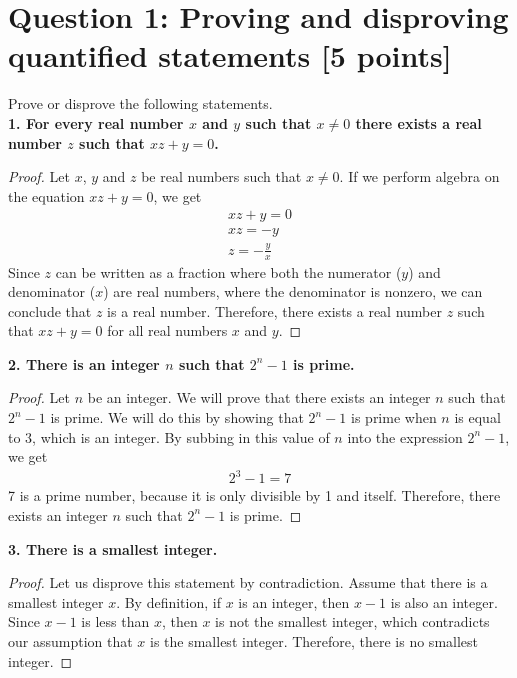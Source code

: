 \documentclass{report}
\theoremstyle{mytheoremstyle}
\theoremstyle{mytheoremstyle}
\theoremstyle{myproblemstyle}
\begin{document}
\section*{\Large{Question 1: Proving and disproving quantified statements [5 points]}}
Prove or disprove the following statements.
\\[\baselineskip]
\textbf{1. For every real number $x$ and $y$ such that $x \neq 0$ there exists a real number $z$ such that $xz+y=0$.}
\begin{proof}
Let $x$, $y$ and $z$ be real numbers such that $x \neq 0$. If we perform algebra on the equation $xz+y=0$, we get 
\begin{align}
xz+y = 0 \\
xz = -y \\
z = -\frac{y}{x}
\end{align}
Since $z$ can be written as a fraction where both the numerator ($y$) and denominator ($x$) are real numbers, where the denominator is nonzero, we can conclude that $z$ is a real number. Therefore, there exists a real number $z$ such that $xz+y=0$ for all real numbers $x$ and $y$.
\end{proof}
\textbf{2. There is an integer $n$ such that $2^n-1$ is prime.}
\begin{proof}
Let $n$ be an integer. We will prove that there exists an integer $n$ such that $2^n-1$ is prime. We will do this by showing that $2^n-1$ is prime when $n$ is equal to $3$, which is an integer. By subbing in this value of $n$ into the expression $2^n-1$, we get 
\begin{align}
2^3-1=7
\end{align}
7 is a prime number, because it is only divisible by 1 and itself. Therefore, there exists an integer $n$ such that $2^n-1$ is prime.
\end{proof}
\textbf{3. There is a smallest integer.}
\begin{proof}
Let us disprove this statement by contradiction. Assume that there is a smallest integer $x$. By definition, if $x$ is an integer, then $x-1$ is also an integer. Since $x-1$ is less than $x$, then $x$ is not the smallest integer, which contradicts our assumption that $x$ is the smallest integer. Therefore, there is no smallest integer.
\end{proof}
\newpage
\end{document}

